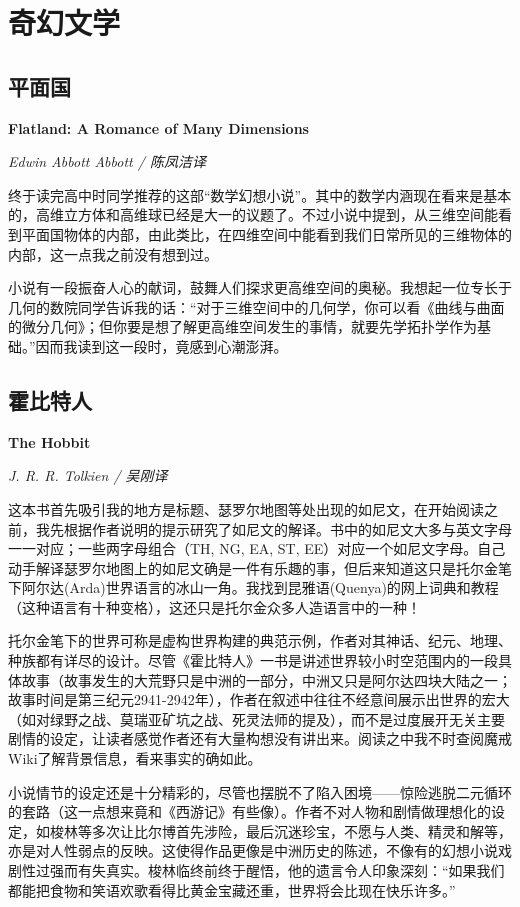 \section{奇幻文学}

\subsection*{平面国}
\par \textbf{Flatland: A Romance of Many Dimensions}
\par \emph{Edwin Abbott Abbott /  陈凤洁译} 
\par 终于读完高中时同学推荐的这部“数学幻想小说”。其中的数学内涵现在看来是基本的，高维立方体和高维球已经是大一的议题了。不过小说中提到，从三维空间能看到平面国物体的内部，由此类比，在四维空间中能看到我们日常所见的三维物体的内部，这一点我之前没有想到过。
\par 小说有一段振奋人心的献词，鼓舞人们探求更高维空间的奥秘。我想起一位专长于几何的数院同学告诉我的话：“对于三维空间中的几何学，你可以看《曲线与曲面的微分几何》；但你要是想了解更高维空间发生的事情，就要先学拓扑学作为基础。”因而我读到这一段时，竟感到心潮澎湃。
\par {}

\subsection*{霍比特人}
\par \textbf{The Hobbit}
\par \emph{J. R. R. Tolkien / 吴刚译} 

\par 这本书首先吸引我的地方是标题、瑟罗尔地图等处出现的如尼文，在开始阅读之前，我先根据作者说明的提示研究了如尼文的解译。书中的如尼文大多与英文字母一一对应；一些两字母组合（TH, NG, EA, ST, EE）对应一个如尼文字母。自己动手解译瑟罗尔地图上的如尼文确是一件有乐趣的事，但后来知道这只是托尔金笔下阿尔达(Arda)世界语言的冰山一角。我找到昆雅语(Quenya)的网上词典和教程（这种语言有十种变格），这还只是托尔金众多人造语言中的一种！
\par 托尔金笔下的世界可称是虚构世界构建的典范示例，作者对其神话、纪元、地理、种族都有详尽的设计。尽管《霍比特人》一书是讲述世界较小时空范围内的一段具体故事（故事发生的大荒野只是中洲的一部分，中洲又只是阿尔达四块大陆之一；故事时间是第三纪元2941-2942年），作者在叙述中往往不经意间展示出世界的宏大（如对绿野之战、莫瑞亚矿坑之战、死灵法师的提及），而不是过度展开无关主要剧情的设定，让读者感觉作者还有大量构想没有讲出来。阅读之中我不时查阅魔戒Wiki了解背景信息，看来事实的确如此。
\par 小说情节的设定还是十分精彩的，尽管也摆脱不了陷入困境——惊险逃脱二元循环的套路（这一点想来竟和《西游记》有些像）。作者不对人物和剧情做理想化的设定，如梭林等多次让比尔博首先涉险，最后沉迷珍宝，不愿与人类、精灵和解等，亦是对人性弱点的反映。这使得作品更像是中洲历史的陈述，不像有的幻想小说戏剧性过强而有失真实。梭林临终前终于醒悟，他的遗言令人印象深刻：“如果我们都能把食物和笑语欢歌看得比黄金宝藏还重，世界将会比现在快乐许多。”
\par {}

